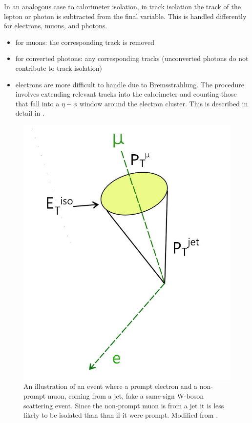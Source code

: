 In an analogous case to calorimeter isolation, in track isolation the track of the lepton or photon is subtracted from the final variable. This is handled differently for electrons, muons, and photons.
\begin{itemize}
\item for muons: the corresponding track is removed
\item for converted photons: any corresponding tracks (unconverted photons do not contribute to track isolation)
\item electrons are more difficult to handle due to Bremsstrahlung. The procedure involves extending relevant tracks into the calorimeter and counting those that fall into a $\eta - \phi$ window around the electron cluster. This is described in detail in \cite{laplace_23}.
\end{itemize}
\begin{figure}
\centering
\includegraphics[scale=0.2]{images/iso_cone.jpg}
\caption{An illustration of an event where a prompt electron and a non-prompt muon, coming from a jet, fake a same-sign W-boson scattering event. Since the non-prompt muon is from a jet it is less likely to be isolated than than if it were prompt. Modified from \cite{ssWW_int_note}.}
\label{isolation_cone}
\end{figure}


